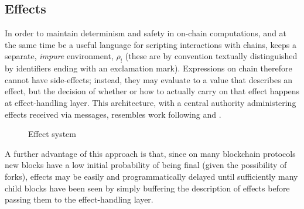 \subsection{Effects} In order to maintain determinism and safety in on-chain
computations, and at the same time be a useful language for scripting
interactions with chains, \rad keeps a separate, \textit{impure} environment,
$\rho_{!}$ (these are by convention textually distinguished by identifiers
ending with an exclamation mark). Expressions on chain therefore cannot have
side-effects; instead, they may evaluate to a value that describes an effect,
but the decision of whether or how to actually carry on that effect happens at
effect-handling layer. This architecture, with a central authority
administering effects received via messages, resembles work following
\cite{Cartwright1994} and \cite{Bauer2003}.

\begin{figure}[H]
\caption{Effect system}
\label{f:effects}
\end{figure}

A further advantage of this approach is that, since on many blockchain
protocols new blocks have a low initial probability of being final (given the
possibility of forks), effects may be easily and programmatically delayed until
sufficiently many child blocks have been seen by simply buffering the
description of effects before passing them to the effect-handling layer.

